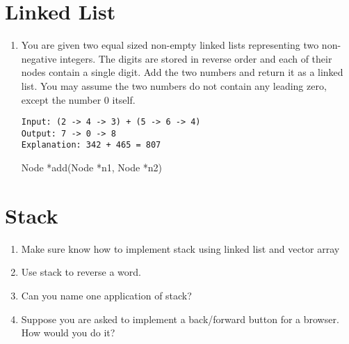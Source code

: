 \documentclass[12pt]{article}
\begin{document}
\section{Linked List}
\begin{enumerate}
    \item You are given two equal sized non-empty linked lists representing two non-negative integers. 
    The digits are stored in reverse order and each of their nodes contain a single digit. 
    Add the two numbers and return it as a linked list. You may assume the two numbers do 
    not contain any leading zero, except the number 0 itself.
    \begin{verbatim}
Input: (2 -> 4 -> 3) + (5 -> 6 -> 4)
Output: 7 -> 0 -> 8
Explanation: 342 + 465 = 807
    \end{verbatim}
    Node *add(Node *n1, Node *n2) {}
\end{enumerate}

\section{Stack}
\begin{enumerate}
    \item Make sure know how to implement stack using linked list and vector array
    \item Use stack to reverse a word.
    \item Can you name one application of stack?
    \item Suppose you are asked to implement a back/forward button for a browser. How would you do it?
\end{enumerate}
\end{document}
